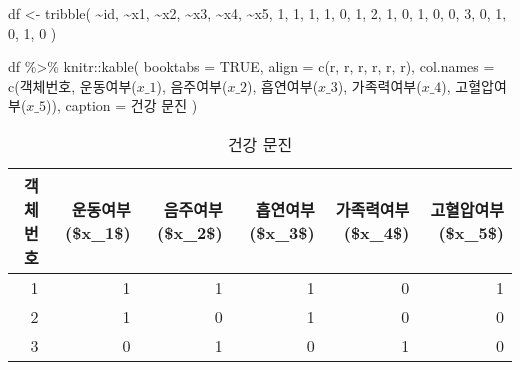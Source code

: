 \documentclass[
]{book}
\newenvironment{Shaded}{\begin{snugshade}}{\end{snugshade}}
\newcommand{\AttributeTok}[1]{\textcolor[rgb]{0.77,0.63,0.00}{#1}}
\newcommand{\ConstantTok}[1]{\textcolor[rgb]{0.00,0.00,0.00}{#1}}
\newcommand{\DecValTok}[1]{\textcolor[rgb]{0.00,0.00,0.81}{#1}}
\newcommand{\FunctionTok}[1]{\textcolor[rgb]{0.00,0.00,0.00}{#1}}
\newcommand{\NormalTok}[1]{#1}
\newcommand{\OtherTok}[1]{\textcolor[rgb]{0.56,0.35,0.01}{#1}}
\newcommand{\SpecialCharTok}[1]{\textcolor[rgb]{0.00,0.00,0.00}{#1}}
\newcommand{\StringTok}[1]{\textcolor[rgb]{0.31,0.60,0.02}{#1}}
\begin{document}
\begin{Shaded}
\begin{Highlighting}[]
\NormalTok{df }\OtherTok{\textless{}{-}} \FunctionTok{tribble}\NormalTok{(}
  \SpecialCharTok{\textasciitilde{}}\NormalTok{id, }\SpecialCharTok{\textasciitilde{}}\NormalTok{x1, }\SpecialCharTok{\textasciitilde{}}\NormalTok{x2, }\SpecialCharTok{\textasciitilde{}}\NormalTok{x3, }\SpecialCharTok{\textasciitilde{}}\NormalTok{x4, }\SpecialCharTok{\textasciitilde{}}\NormalTok{x5,}
  \DecValTok{1}\NormalTok{, }\DecValTok{1}\NormalTok{, }\DecValTok{1}\NormalTok{, }\DecValTok{1}\NormalTok{, }\DecValTok{0}\NormalTok{, }\DecValTok{1}\NormalTok{,}
  \DecValTok{2}\NormalTok{, }\DecValTok{1}\NormalTok{, }\DecValTok{0}\NormalTok{, }\DecValTok{1}\NormalTok{, }\DecValTok{0}\NormalTok{, }\DecValTok{0}\NormalTok{,}
  \DecValTok{3}\NormalTok{, }\DecValTok{0}\NormalTok{, }\DecValTok{1}\NormalTok{, }\DecValTok{0}\NormalTok{, }\DecValTok{1}\NormalTok{, }\DecValTok{0}
\NormalTok{)}

\NormalTok{df }\SpecialCharTok{\%\textgreater{}\%}
\NormalTok{  knitr}\SpecialCharTok{::}\FunctionTok{kable}\NormalTok{(}
    \AttributeTok{booktabs =} \ConstantTok{TRUE}\NormalTok{,}
    \AttributeTok{align =} \FunctionTok{c}\NormalTok{(}\StringTok{\textquotesingle{}r\textquotesingle{}}\NormalTok{, }\StringTok{\textquotesingle{}r\textquotesingle{}}\NormalTok{, }\StringTok{\textquotesingle{}r\textquotesingle{}}\NormalTok{, }\StringTok{\textquotesingle{}r\textquotesingle{}}\NormalTok{, }\StringTok{\textquotesingle{}r\textquotesingle{}}\NormalTok{, }\StringTok{\textquotesingle{}r\textquotesingle{}}\NormalTok{),}
    \AttributeTok{col.names =} \FunctionTok{c}\NormalTok{(}\StringTok{\textquotesingle{}객체번호\textquotesingle{}}\NormalTok{, }\StringTok{\textquotesingle{}운동여부($x\_1$)\textquotesingle{}}\NormalTok{, }\StringTok{\textquotesingle{}음주여부($x\_2$)\textquotesingle{}}\NormalTok{, }\StringTok{\textquotesingle{}흡연여부($x\_3$)\textquotesingle{}}\NormalTok{, }\StringTok{\textquotesingle{}가족력여부($x\_4$)\textquotesingle{}}\NormalTok{, }\StringTok{\textquotesingle{}고혈압여부($x\_5$)\textquotesingle{}}\NormalTok{),}
    \AttributeTok{caption =} \StringTok{\textquotesingle{}건강 문진\textquotesingle{}}
\NormalTok{  )}
\end{Highlighting}
\end{Shaded}

\begin{table}

\caption{\label{tab:health-question-df}건강 문진}
\centering
\begin{tabular}[t]{rrrrrr}
\toprule
객체번호 & 운동여부(\$x\_1\$) & 음주여부(\$x\_2\$) & 흡연여부(\$x\_3\$) & 가족력여부(\$x\_4\$) & 고혈압여부(\$x\_5\$)\\
\midrule
1 & 1 & 1 & 1 & 0 & 1\\
2 & 1 & 0 & 1 & 0 & 0\\
3 & 0 & 1 & 0 & 1 & 0\\
\bottomrule
\end{tabular}
\end{table}
\end{document}
